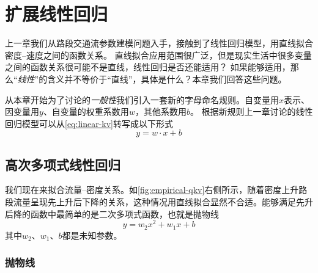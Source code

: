 \chapter{扩展线性回归}

上一章我们从路段交通流参数建模问题入手，接触到了线性回归模型，用直线拟合密度--速度之间的函数关系。
直线拟合应用范围很广泛，但是现实生活中很多变量之间的函数关系很可能不是直线，线性回归是否还能适用？
如果能够适用，那么“\emph{线性}”的含义并不等价于“直线”，具体是什么？本章我们回答这些问题。

从本章开始为了讨论的\emph{一般性}我们引入一套新的字母命名规则。自变量用$x$表示、因变量用$y$、自变量的权重系数用$w$，其他系数用$b$。
根据新规则上一章讨论的线性回归模型可以从\cref{eq:linear-kv}转写成以下形式
\begin{equation*}
    y=w\cdot x+b
\end{equation*}

\section{高次多项式线性回归}
我们现在来拟合流量--密度关系。如\cref{fig:empirical-qkv}右侧所示，随着密度上升路段流量呈现先上升后下降的关系，这种情况用直线拟合显然不合适。能够满足先升后降的函数中最简单的是二次多项式函数，也就是抛物线
\begin{equation}
    y=w_2 x^2 + w_1 x + b
\end{equation}
其中$w_2$、$w_1$、$b$都是未知参数。

\subsection{抛物线}

